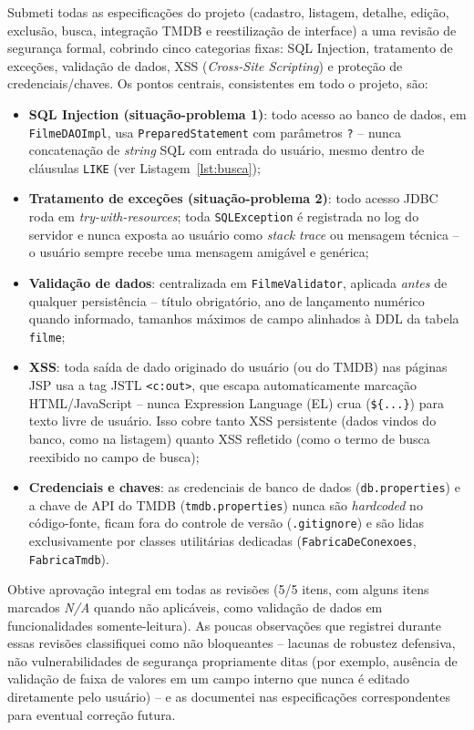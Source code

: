 \documentclass[12pt,a4paper]{article}
\begin{document}
Submeti todas as especificações do projeto (cadastro, listagem, detalhe, edição, exclusão,
busca, integração TMDB e reestilização de interface) a uma revisão de segurança formal, cobrindo
cinco categorias fixas: SQL Injection, tratamento de exceções, validação de dados, XSS
(\textit{Cross-Site Scripting}) e proteção de credenciais/chaves. Os pontos centrais,
consistentes em todo o projeto, são:

\begin{itemize}
    \item \textbf{SQL Injection (situação-problema 1)}: todo acesso ao banco de dados, em
        \texttt{FilmeDAOImpl}, usa \texttt{PreparedStatement} com parâmetros \texttt{?} -- nunca
        concatenação de \textit{string} SQL com entrada do usuário, mesmo dentro de cláusulas
        \texttt{LIKE} (ver Listagem~\ref{lst:busca});
    \item \textbf{Tratamento de exceções (situação-problema 2)}: todo acesso JDBC roda em
        \textit{try-with-resources}; toda \texttt{SQLException} é registrada no log do servidor e
        nunca exposta ao usuário como \textit{stack trace} ou mensagem técnica -- o usuário
        sempre recebe uma mensagem amigável e genérica;
    \item \textbf{Validação de dados}: centralizada em \texttt{FilmeValidator}, aplicada
        \textit{antes} de qualquer persistência -- título obrigatório, ano de lançamento numérico
        quando informado, tamanhos máximos de campo alinhados à DDL da tabela \texttt{filme};
    \item \textbf{XSS}: toda saída de dado originado do usuário (ou do TMDB) nas páginas JSP usa a
        tag JSTL \texttt{<c:out>}, que escapa automaticamente marcação HTML/JavaScript -- nunca
        Expression Language (EL) crua (\texttt{\$\{...\}}) para texto livre de usuário. Isso cobre
        tanto XSS persistente (dados vindos do banco, como na listagem) quanto XSS refletido
        (como o termo de busca reexibido no campo de busca);
    \item \textbf{Credenciais e chaves}: as credenciais de banco de dados (\texttt{db.properties})
        e a chave de API do TMDB (\texttt{tmdb.properties}) nunca são \textit{hardcoded} no
        código-fonte, ficam fora do controle de versão (\texttt{.gitignore}) e são lidas
        exclusivamente por classes utilitárias dedicadas (\texttt{FabricaDeConexoes},
        \texttt{FabricaTmdb}).
\end{itemize}

Obtive aprovação integral em todas as revisões (5/5 itens, com alguns itens marcados
\textit{N/A} quando não aplicáveis, como validação de dados em funcionalidades somente-leitura).
As poucas observações que registrei durante essas revisões classifiquei como não bloqueantes --
lacunas de robustez defensiva, não vulnerabilidades de segurança propriamente ditas (por
exemplo, ausência de validação de faixa de valores em um campo interno que nunca é editado
diretamente pelo usuário) -- e as documentei nas especificações correspondentes para eventual
correção futura.
\end{document}
